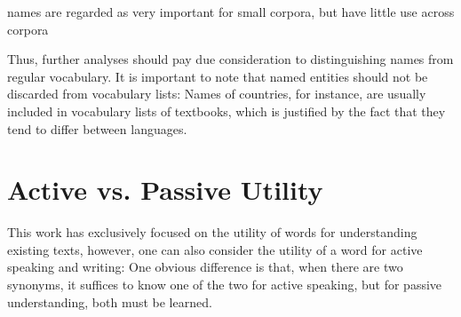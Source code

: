 names are regarded as very important for small corpora, but have little use across corpora

Thus, further analyses should pay due consideration to distinguishing names from regular vocabulary.
It is important to note that named entities should not be discarded from vocabulary lists:
Names of countries, for instance, are usually included in vocabulary lists of textbooks, which is justified by the fact that they tend to differ between languages.

\section{Active vs. Passive Utility}
This work has exclusively focused on the utility of words for understanding existing texts, however, one can also consider the utility of a word for active speaking and writing:
One obvious difference is that, when there are two synonyms, it suffices to know one of the two for active speaking, but for passive understanding, both must be learned.

